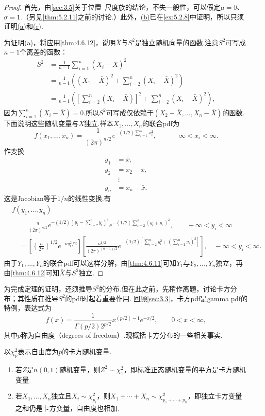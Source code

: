 \begin{proof}
首先，由\autoref{sec:3.5}关于位置–尺度族的结论，不失一般性，可以假定$\mu=0$、$\sigma=1$.（另见\autoref{thm:5.2.11}之前的讨论.）此外，\hyperref[item:5.3.1b]{(b)}已在\autoref{ex:5.2.8}中证明，所以只须证明\hyperref[item:5.3.1a]{(a)}和\hyperref[item:5.3.1c]{(c)}.

为证明\hyperref[item:5.3.1a]{(a)}，将应用\autoref{thm:4.6.12}，说明$\bar X$与$S^2$是独立随机向量的函数.注意$S^2$可写成$n-1$个离差的函数：
\begin{align*}
S^2&=\frac1{n-1}\sum_{i=1}^n(X_i-\bar X)^2\\
&=\frac1{n-1}\left((X_1-\bar X)^2+\sum_{i=2}^n(X_i-\bar X)^2\right)\\
&=\frac1{n-1}\left(\left[\sum_{i=2}^n(X_i-\bar X)\right]^2+\sum_{i=2}^n(X_i-\bar X)^2\right),
\end{align*}
因为$\sum_{i=1}^n(X_i-\bar X)=0$.所以$S^2$可写成仅依赖于$(X_2-\bar X,\ldots,X_n-\bar X)$的函数.下面说明这些随机变量与$\bar X$独立.样本$X_1,\ldots,X_n$的联合pdf为
$$f(x_1,\ldots,x_n)=\frac1{(2\pi)^{n/2}}e^{-(1/2)\sum_{i=1}^n x_i^2},\qquad -\infty<x_i<\infty.$$
作变换
$$\begin{aligned}
y_1&=\bar x,\\y_2&=x_2-\bar x,\\&\ \vdots\\y_n&=x_n-\bar x.
\end{aligned}$$
这是Jacobian等于$1/n$的线性变换.有
\begin{align*}
&f(y_1,\ldots,y_n)\\
&\quad=\frac n{(2\pi)^{n/2}}e^{-(1/2)(y_1-\sum_{i=2}^n y_i)^2}e^{-(1/2)\sum_{i=2}^n(y_i+y_1)^2},\qquad -\infty<y_i<\infty\\
&\quad=\left[\left(\frac n{2\pi}\right)^{1/2}e^{-ny_1^2/2}\right]
\left[\frac{n^{1/2}}{(2\pi)^{(n-1)/2}}e^{-(1/2)[\sum_{i=2}^n y_i^2+(\sum_{i=2}^n y_i)^2]}\right],\quad -\infty<y_i<\infty.
\end{align*}
由于$Y_1,\ldots,Y_n$的联合pdf可以这样分解，由\autoref{thm:4.6.11}可知$Y_1$与$Y_2,\ldots,Y_n$独立，再由\autoref{thm:4.6.12}可知$\bar X$与$S^2$独立.
\end{proof}
为完成定理的证明，还须推导$S^2$的分布.但在此之前，先稍作离题，讨论卡方分布；其性质在推导$S^2$的pdf时起着重要作用.
回顾\autoref{sec:3.3}，卡方pdf是gamma pdf的特例，表达式为
$$f(x)=\frac1{\Gamma(p/2)2^{p/2}}x^{(p/2)-1}e^{-x/2},\qquad 0<x<\infty,$$
其中$p$称为自由度（degrees of freedom）.现概括卡方分布的一些相关事实.
\begin{lemma}[关于卡方随机变量的事实]\label{lem:5.3.2}
以$\chi_p^2$表示自由度为$p$的卡方随机变量.
\begin{enumerate}[label=\textbf{\alph*.}]
\item\label{item:5.3.2a} 若$Z$是$n(0,1)$随机变量，则$Z^2\sim\chi_1^2$，即标准正态随机变量的平方是卡方随机变量.
\item\label{item:5.3.2b} 若$X_1,\ldots,X_n$独立且$X_i\sim\chi_{p_i}^2$，则$X_1+\cdots+X_n\sim\chi_{p_1+\cdots+p_n}^2$，即独立卡方变量之和仍是卡方变量，自由度也相加.
\end{enumerate}
\end{lemma}
